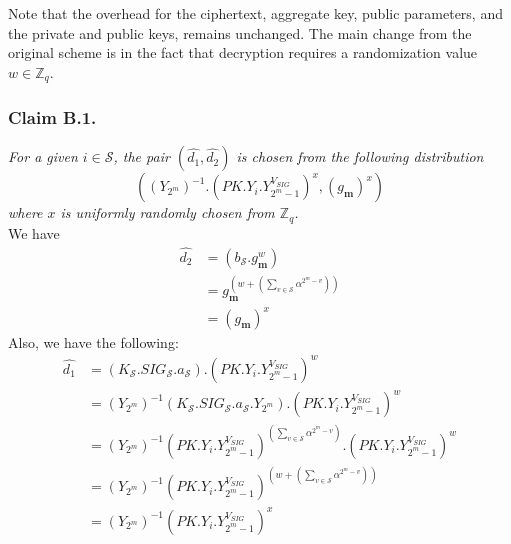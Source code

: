 \noindent Note that the overhead for the ciphertext, aggregate key, public parameters, and the private and public keys, remains unchanged. The main change from the original scheme is in the fact that decryption requires a randomization value $w\in\mathbb{Z}_q$.

\subsubsection{Claim B.1.} \textit{For a given $i\in\mathcal{S}$, the pair $(\hat{d_1},\hat{d_2})$ is chosen from the following distribution 
\begin{equation}
\left(\left({Y_{2^m}}\right)^{-1}.\left(PK.Y_i.Y^{V_{SIG}}_{2^m-1}\right)^x,\left(g_{\mathbf{m}}\right)^x\right)\nonumber
\end{equation}
\noindent where $x$ is uniformly randomly chosen from $\mathbb{Z}_q$.}\\

 We have 
\begin{equation}
\begin{split}
 \hat{d_2} &= \left(b_{\mathcal{S}}.g^w_{\mathbf{m}}\right)\\
 &= g^{\left(w+\left(\sum_{v\in\mathcal{S}}\alpha^{2^m-v}\right)\right)}_{\mathbf{m}}\\
 &= \left(g_{\mathbf{m}}\right)^x\nonumber
\end{split}
\end{equation}
\noindent Also, we have the following:
\begin{equation}
\begin{split}
 \hat{d_1} &= \left(K_{\mathcal{S}}.SIG_{\mathcal{S}}.a_{\mathcal{S}}\right).\left(PK.Y_i.Y^{V_{SIG}}_{2^m-1}\right)^w\\
 &= \left({Y_{2^m}}\right)^{-1}\left(K_{\mathcal{S}}.SIG_{\mathcal{S}}.a_{\mathcal{S}}.{Y_{2^m}}\right).\left(PK.Y_i.Y^{V_{SIG}}_{2^m-1}\right)^w\\
 &= \left({Y_{2^m}}\right)^{-1}\left(PK.Y_i.Y^{V_{SIG}}_{2^m-1}\right)^{\left(\sum_{v\in\mathcal{S}}\alpha^{2^m-v}\right)}.\left(PK.Y_i.Y^{V_{SIG}}_{2^m-1}\right)^w\\
 &= \left({Y_{2^m}}\right)^{-1}\left(PK.Y_i.Y^{V_{SIG}}_{2^m-1}\right)^{(w+\left(\sum_{v\in\mathcal{S}}\alpha^{2^m-v}\right))}\\
 &= \left({Y_{2^m}}\right)^{-1}\left(PK.Y_i.Y^{V_{SIG}}_{2^m-1}\right)^x\nonumber
\end{split} 
\end{equation}


